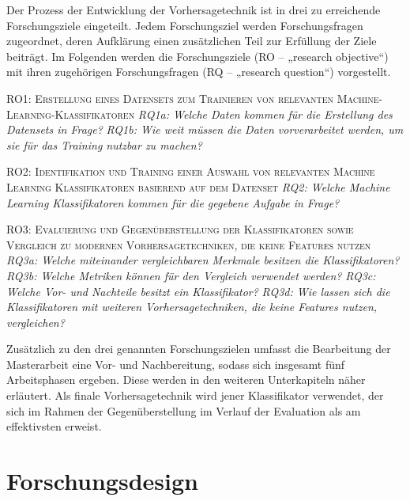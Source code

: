 Der Prozess der Entwicklung der Vorhersagetechnik ist in drei zu erreichende Forschungsziele eingeteilt. Jedem Forschungsziel werden Forschungsfragen zugeordnet, deren Aufklärung einen zusätzlichen Teil zur Erfüllung der Ziele beiträgt. Im Folgenden werden die Forschungsziele (RO – „research objective“) mit ihren zugehörigen Forschungsfragen (RQ – „research question“) vorgestellt.

\label{research_objectives}
\begin{flushleft}
\textsc{RO1: Erstellung eines Datensets zum Trainieren von relevanten Machine-
Learning-Klassifikatoren}\medskip\linebreak 
\emph{RQ1a: Welche Daten kommen für die Erstellung des Datensets in Frage?}\linebreak
\emph{RQ1b: Wie weit müssen die Daten vorverarbeitet werden, um sie für das Training nutzbar zu machen?}

\textsc{RO2: Identifikation und Training einer Auswahl von relevanten Machine Learning Klassifikatoren basierend auf dem Datenset}\medskip\linebreak 
\emph{RQ2: Welche Machine Learning Klassifikatoren kommen für die gegebene Aufgabe in Frage?}

\textsc{RO3: Evaluierung und Gegenüberstellung der Klassifikatoren sowie Vergleich zu modernen Vorhersagetechniken, die keine Features nutzen}\medskip\linebreak 
\emph{RQ3a: Welche miteinander vergleichbaren Merkmale besitzen die Klassifikatoren?}\linebreak 
\emph{RQ3b: Welche Metriken können für den Vergleich verwendet werden?}\linebreak 
\emph{RQ3c: Welche Vor- und Nachteile besitzt ein Klassifikator?}\linebreak 
\emph{RQ3d: Wie lassen sich die Klassifikatoren mit weiteren Vorhersagetechniken, die keine Features nutzen, vergleichen?}
\end{flushleft}

\label{phases_definition}

Zusätzlich zu den drei genannten Forschungszielen umfasst die Bearbeitung der Masterarbeit eine Vor- und Nachbereitung, sodass sich insgesamt fünf Arbeitsphasen ergeben. Diese werden in den weiteren Unterkapiteln näher erläutert. Als finale Vorhersagetechnik wird jener Klassifikator verwendet, der sich im Rahmen der Gegenüberstellung im Verlauf der Evaluation als am effektivsten erweist.

\section{Forschungsdesign}

